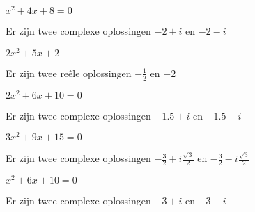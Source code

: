 \documentclass{ximera}
\begin{document}
\begin{exercise}

    \begin{question} \( x^2 + 4x + 8 = 0     \) \begin{uitkomst} Er zijn twee complexe oplossingen  \( -2 + i                              \) en  \(  -2 - i                             \) \end{uitkomst} \end{question}
    \begin{question} \( 2x^2 + 5x + 2        \) \begin{uitkomst} Er zijn twee reêle oplossingen     \( -\frac{1}{2}                        \) en  \(   -2                                \) \end{uitkomst} \end{question}
    \begin{question} \(  2x^2 + 6x + 10 = 0  \) \begin{uitkomst} Er zijn twee complexe oplossingen  \( -1.5 + i                            \) en  \(  -1.5 - i                           \) \end{uitkomst} \end{question}
    \begin{question} \(  3x^2 + 9x + 15 = 0  \) \begin{uitkomst} Er zijn twee complexe oplossingen  \(  -\frac{3}{2} + i\frac{\sqrt{3}}{2} \) en  \(  -\frac{3}{2} - i\frac{\sqrt{3}}{2} \) \end{uitkomst} \end{question}
    \begin{question} \(  x^2 + 6x + 10 = 0   \) \begin{uitkomst} Er zijn twee complexe oplossingen  \( -3 + i                              \) en  \(  -3 - i                             \) \end{uitkomst} \end{question}
 
\end{exercise} 
\end{document}
